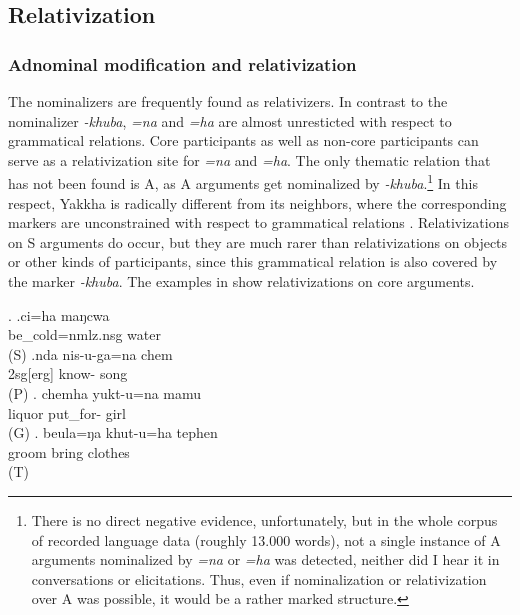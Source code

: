 \subsection{Relativization}\label{nmlz-uni-1}

\subsubsection{Adnominal modification and relativization}

The nominalizers are frequently found as relativizers. In contrast to the nominalizer \emph{-khuba}, \emph{=na} and \emph{=ha} are almost unresticted with respect to grammatical relations. Core participants as well as non-core participants can serve as a relativization site for  \emph{=na} and \emph{=ha}. The only thematic relation that has not been found is A, as A arguments get nominalized by \emph{-khuba}.\footnote{There is no direct negative evidence, unfortunately, but in the whole corpus of recorded language data (roughly 13.000 words), not a single instance of A arguments nominalized by \emph{=na} or \emph{=ha} was detected, neither did I hear it in conversations or elicitations. Thus, even if nominalization or relativization over A was possible, it would  be a rather marked structure.} In this respect, Yakkha is radically different from its neighbors, where the corresponding markers are unconstrained with respect to grammatical relations \citep{Ebert1997A-grammar, Bickel1999Nominalization}. Relativizations on S arguments do occur, but they are much rarer than relativizations on objects or other kinds of participants, since this grammatical relation is also covered by the marker \emph{-khuba}. The examples in  \Next show relativizations on core arguments.  

\ex. \ag.ci=ha maŋcwa\\
be\_cold{\sc =nmlz.nsg} water\\
 (S)
\bg.nda nis-u-ga=na chem\\
{\sc 2sg[erg]} know- song\\
 (P)
	\bg. chemha yukt-u=na mamu\\
liquor  put\_for- girl\\
 (G)
\bg. beula=ŋa khut-u=ha tephen\\ 
groom bring clothes\\
 (T) 

